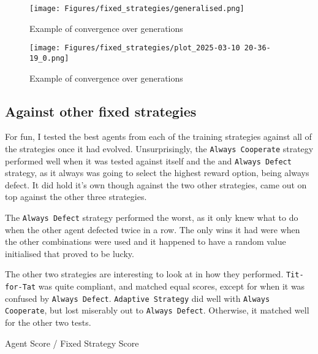 \documentclass[11pt]{scrartcl} %
\begin{document}


\begin{figure}[H]
	\centering
	\texttt{[image: Figures/fixed\_strategies/generalised.png]}
	\caption{Example of convergence over generations}
	\label{fig:convergence_example}
\end{figure}


\begin{figure}[h!]
	\centering
	\texttt{[image: Figures/fixed\_strategies/plot\_2025-03-10 20-36-19\_0.png]}
	\caption{Example of convergence over generations}
	\label{fig:convergence_example}
\end{figure}

\subsection{Against other fixed strategies}

For fun, I tested the best agents from each of the training strategies against all of the strategies once it had evolved.
Unsurprisingly, the \texttt{Always Cooperate} strategy performed well when it was tested against itself and the and \texttt{Always Defect} strategy, as it always was going to select the highest reward option, being always defect.
It did hold it's own though against the two other strategies, came out on top against the other three strategies.

The \texttt{Always Defect} strategy performed the worst, as it only knew what to do when the other agent defected twice in a row. 
The only wins it had were when the other combinations were used and it happened to have a random value initialised that proved to be lucky.


The other two strategies are interesting to look at in how they performed.
\texttt{Tit-for-Tat} was quite compliant, and matched equal scores, except for when it was confused by \texttt{Always Defect}.
\texttt{Adaptive Strategy} did well with \texttt{Always Cooperate}, but lost miserably out to \texttt{Always Defect}. Otherwise, it matched well for the other two tests.

Agent Score / Fixed Strategy Score
\end{document}
